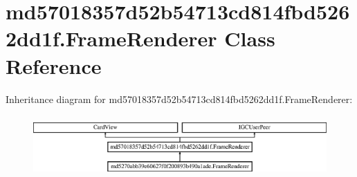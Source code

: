 \hypertarget{classmd57018357d52b54713cd814fbd5262dd1f_1_1FrameRenderer}{}\section{md57018357d52b54713cd814fbd5262dd1f.\+Frame\+Renderer Class Reference}
\label{classmd57018357d52b54713cd814fbd5262dd1f_1_1FrameRenderer}
Inheritance diagram for md57018357d52b54713cd814fbd5262dd1f.\+Frame\+Renderer\+:\begin{figure}[H]
\begin{center}
\leavevmode
\includegraphics[height=2.372881cm]{classmd57018357d52b54713cd814fbd5262dd1f_1_1FrameRenderer}
\end{center}
\end{figure}
